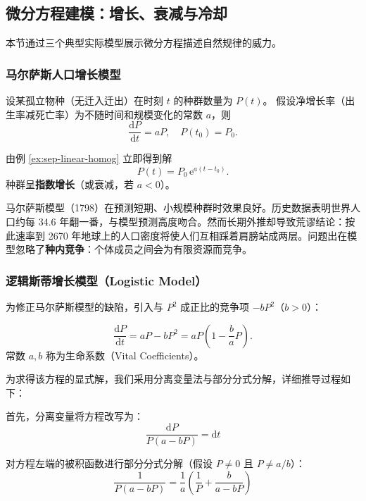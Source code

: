 \documentclass[lang=cn,11pt]{elegantbook}
\begin{document}
\subsection{微分方程建模：增长、衰减与冷却}

本节通过三个典型实际模型展示微分方程描述自然规律的威力。

\subsubsection*{马尔萨斯人口增长模型}

\begin{definition} \label{def:malthus-model}
设某孤立物种（无迁入迁出）在时刻 $t$ 的种群数量为 $P(t)$。
假设净增长率（出生率减死亡率）为不随时间和规模变化的常数 $a$，则
\[
\frac{\mathrm{d}P}{\mathrm{d}t}=aP,\quad P(t_0)=P_0. \tag{5.5}
\]
\end{definition}

由例 \ref{ex:sep-linear-homog} 立即得到解
\[
\boxed{P(t)=P_0\,\mathrm{e}^{a(t-t_0)}}. \tag{5.6}
\]
种群呈\textbf{指数增长}（或衰减，若 $a<0$）。

\begin{note}
马尔萨斯模型（1798）在预测短期、小规模种群时效果良好。历史数据表明世界人口约每 34.6 年翻一番，与模型预测高度吻合。然而长期外推却导致荒谬结论：按此速率到 2670 年地球上的人口密度将使人们互相踩着肩膀站成两层。问题出在模型忽略了\textbf{种内竞争}：个体成员之间会为有限资源而竞争。
\end{note}

\subsubsection*{逻辑斯蒂增长模型（Logistic Model）}

为修正马尔萨斯模型的缺陷，引入与 $P^2$ 成正比的竞争项 $-bP^2$（$b>0$）：

\begin{definition}[逻辑斯蒂模型] \label{def:logistic-model}
\[
\frac{\mathrm{d}P}{\mathrm{d}t}=aP-bP^{2}=aP\left(1-\frac{b}{a}P\right). \tag{5.7}
\]
常数 $a,b$ 称为生命系数（Vital Coefficients）。
\end{definition}

为求得该方程的显式解，我们采用分离变量法与部分分式分解，详细推导过程如下：

首先，分离变量将方程改写为：
\[
\frac{\mathrm{d}P}{P(a-bP)} = \mathrm{d}t
\]

对方程左端的被积函数进行部分分式分解（假设 $P \neq 0$ 且 $P \neq a/b$）：
\[
\frac{1}{P(a-bP)} = \frac{1}{a} \left( \frac{1}{P} + \frac{b}{a-bP} \right)
\]
\end{document}
